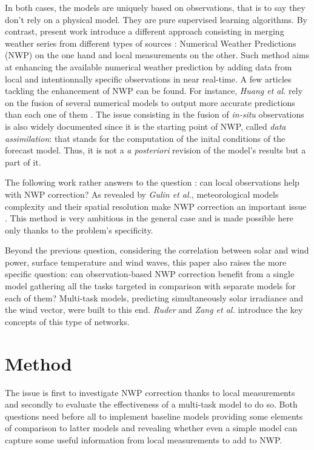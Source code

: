 \documentclass{article}
\newcommand{\saut}{\vspace{10px}}
\begin{document}
\saut

In both cases, the models are uniquely based on observations, that is to say they don't rely on a physical model.
They are pure supervised learning algorithms. By contrast, present work introduce a different approach consisting in
merging weather series from different types of sources : Numerical Weather Predictions (NWP) on the one hand and
local measurements on the other. Such method aims at enhancing the available numerical weather prediction by 
adding data from local and intentionnally specific observations in near real-time. A few articles tackling the
enhancement of NWP can be found. For instance, \emph{Huang et al.} rely on the fusion of several numerical models to 
output more accurate predictions than each one of them \cite{huang_integrating_2012}. The issue consisting in the fusion 
of \emph{in-situ} observations is also widely documented since it is the starting point of NWP, called
\emph{data assimilation}: that stands for the computation
of the inital conditions of the forecast model. Thus, it is not a \emph{a posteriori} revision of the model's results but
a part of it. 

\saut

The following work rather answers to the question : can local observations help with NWP correction?
As revealed by \emph{Gulin et al.}, meteorological models complexity and their spatial resolution make NWP
correction an important issue \cite{gulin_predictor-corrector_2015}. This method is very ambitious in the general case and
is made possible here only thanks to the problem's specificity.

\saut

Beyond the previous question, considering the correlation between solar and wind power,
surface temperature and wind waves, this paper also raises the more specific question: can
observation-based NWP correction benefit from a single model gathering all the tasks targeted in comparison with
separate models for each of them? Multi-task models, predicting simultaneously solar irradiance and the wind vector,
were built to this end. \emph{Ruder} \cite{ruder_overview_2017} and \emph{Zang et al.} \cite{zhang_overview_2018}
introduce the key concepts of this type of networks.

\section{Method}

The issue is first to investigate NWP correction thanks to local measurements and secondly to evaluate
the effectiveness of a multi-task model to do so. Both questions need before all to implement baseline models
providing some elements of comparison to latter models and revealing whether even a simple model can
capture some useful information from local measurements to add to NWP.
\end{document}
